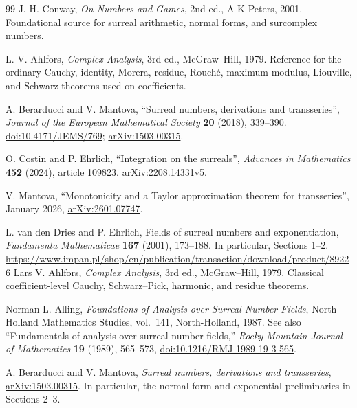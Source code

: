 \documentclass[11pt,a4paper]{article}
\numberwithin{equation}{section}
\theoremstyle{definition}
\theoremstyle{remark}
\theoremstyle{plain}
\newcommand{\arxiv}[1]{\href{https://arxiv.org/abs/#1}{arXiv:#1}}
\begin{document}
\begin{thebibliography}{99}
J. H. Conway, \emph{On Numbers and Games}, 2nd ed., A K Peters, 2001. Foundational source for surreal arithmetic, normal forms, and surcomplex numbers.

L. V. Ahlfors, \emph{Complex Analysis}, 3rd ed., McGraw--Hill, 1979. Reference for the ordinary Cauchy, identity, Morera, residue, Rouch\'e, maximum-modulus, Liouville, and Schwarz theorems used on coefficients.

A. Berarducci and V. Mantova, ``Surreal numbers, derivations and transseries'', \emph{Journal of the European Mathematical Society} \textbf{20} (2018), 339--390. \href{https://doi.org/10.4171/JEMS/769}{doi:10.4171/JEMS/769}; \href{https://arxiv.org/abs/1503.00315}{arXiv:1503.00315}.

O. Costin and P. Ehrlich, ``Integration on the surreals'', \emph{Advances in Mathematics} \textbf{452} (2024), article 109823. \href{https://arxiv.org/abs/2208.14331}{arXiv:2208.14331v5}.

V. Mantova, ``Monotonicity and a Taylor approximation theorem for transseries'', January 2026, \href{https://arxiv.org/abs/2601.07747}{arXiv:2601.07747}.

L. van den Dries and P. Ehrlich, Fields of surreal numbers and exponentiation, \emph{Fundamenta Mathematicae} \textbf{167} (2001), 173--188. In particular, Sections 1--2. \url{https://www.impan.pl/shop/en/publication/transaction/download/product/89226}
Lars V. Ahlfors, \emph{Complex Analysis}, 3rd ed., McGraw--Hill, 1979. Classical coefficient-level Cauchy, Schwarz--Pick, harmonic, and residue theorems.

Norman L. Alling, \emph{Foundations of Analysis over Surreal Number Fields}, North-Holland Mathematics Studies, vol.~141, North-Holland, 1987. See also ``Fundamentals of analysis over surreal number fields,'' \emph{Rocky Mountain Journal of Mathematics} \textbf{19} (1989), 565--573, \href{https://doi.org/10.1216/RMJ-1989-19-3-565}{doi:10.1216/RMJ-1989-19-3-565}.

A. Berarducci and V. Mantova, \emph{Surreal numbers, derivations and transseries}, \arxiv{1503.00315}. In particular, the normal-form and exponential preliminaries in Sections 2--3.


\end{thebibliography}
\end{document}
